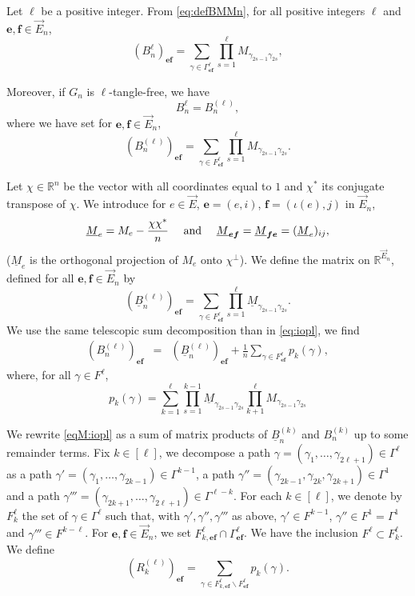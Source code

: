 \documentclass[11pt]{article}
\newcommand{\dR}{\mathbb {R}}
\newcommand{\uB}{{\underline B}}
\newcommand{\1}{1\!\!{\sf I}}\newcommand{\IND}{\1}
\newcommand{\Be}{\bm{e}}
\newcommand{\Bf}{\bm{f}}
\begin{document}
Let $\ell$ be a positive integer. From \eqref{eq:defBMMn}, for all positive integers $\ell$ and $\Be,\Bf \in \vec E_n$,
$$
(B_n^{\ell}) _{\Be \Bf} = \sum_{\gamma \in \Gamma^{\ell} _{\Be \Bf}} \prod_{s=1}^{\ell} M_{\gamma_{2s-1} \gamma_{2s}},
$$

Moreover, if $G_n$ is $\ell$-tangle-free, we have
\begin{equation}\label{eqM:BkBk}
B_n^{\ell}   = B_n^{(\ell)},
\end{equation}
where we have set for $\Be,\Bf \in \vec E_n$,
$$
(B_n^{(\ell)} ) _{\Be \Bf} = \sum_{\gamma \in F^{\ell} _{\Be \Bf}} \prod_{s=1}^{\ell} M_{\gamma_{2s-1} \gamma_{2s}}.
$$

Let $\chi \in \dR^n$ be the vector with all coordinates equal to $1$ and $\chi^*$ its conjugate transpose of $\chi$. We introduce for $e \in \vec E$, $\Be = (e,i)$, $\Bf  = (\iota(e) ,j)$ in $\vec E_n$,
\begin{equation*}\label{eqM:defW}
\underline M_{e} = M_e - \frac {\chi \chi^*} n \quad \hbox{ and } \quad \underline M_{\Be \Bf} =  \underline M_{\Bf  \Be}  = (\underline M_{e})_{i j},
\end{equation*}
($\underline M_e$ is the orthogonal projection of $M_e$ onto $\chi^\perp$). We define the matrix on $\dR^{\vec E_n}$, defined for all $\Be,\Bf \in \vec E_n$ by
\begin{equation}\label{eqM:defD}
(\underline B_n^{(\ell)} ) _{\Be \Bf} = \sum_{\gamma \in F^{\ell} _{\Be \Bf}} \prod_{s=1}^{\ell} \underline M_{\gamma_{2s-1} \gamma_{2s}}.
\end{equation}
 We use the same telescopic sum decomposition than in \eqref{eq:iopl}, we find 
\begin{eqnarray}\label{eqM:iopl}
(B^{(\ell)}_n) _{\Be \Bf} &  =  & (\uB_n^{(\ell)} ) _{\Be\Bf}   + \frac 1 n  \sum_{\gamma \in F^{\ell} _{\Be\Bf}}  p_k(\gamma),
\end{eqnarray}
where, for all $\gamma \in F^{\ell}$, 
$$
p_k (\gamma) =    \sum_{k = 1}^\ell \prod_{s=1}^{k-1} \underline M_{\gamma_{2s-1} \gamma_{2s}} \prod_{k+1}^\ell M_{\gamma_{2s-1} \gamma_{2s}}
$$

We rewrite \eqref{eqM:iopl} as a sum of matrix products of $\uB^{(k)}_n$ and $B_n^{(k)}$ up to some remainder terms.  Fix $k \in [\ell]$, we decompose a path $\gamma  = (\gamma_1, \ldots, \gamma_{2\ell +1} ) \in \Gamma^{\ell}$ as a path $\gamma'=  (\gamma_1, \ldots, \gamma_{2k -1} ) \in  \Gamma ^{k-1}$, a path $\gamma''= (\gamma_{2k-1}, \gamma_{2k} , \gamma_{2k+1} ) \in \Gamma^{1}$ and a path $\gamma''' = (\gamma_{2k+1}, \ldots, \gamma_{2 \ell +1}) \in \Gamma^{\ell - k}$.  For each $k\in [\ell]$, we denote by $F^{\ell}_{k}$ the set of $\gamma \in \Gamma^{\ell}$ such that, with $\gamma', \gamma'', \gamma'''$ as above, $\gamma'  \in F^{k-1}$, $\gamma'' \in F^{1} = \Gamma^1$ and $\gamma''' \in F^{k-\ell}$. For $\Be,\Bf \in \vec E_n$, we set $F^\ell_{k,\Be \Bf}  \cap \Gamma^{\ell}_{\Be \Bf}$. We have the inclusion $F^{\ell} \subset F^{\ell}_{k}$. We define 
\begin{equation}\label{eqM:defR}
(R_k^{(\ell)} )_{\Be \Bf}   =  \sum_{\gamma \in F^{\ell} _{k, \Be \Bf} \backslash F^\ell_{\Be \Bf}}   p_k(\gamma).
\end{equation}
\end{document}
